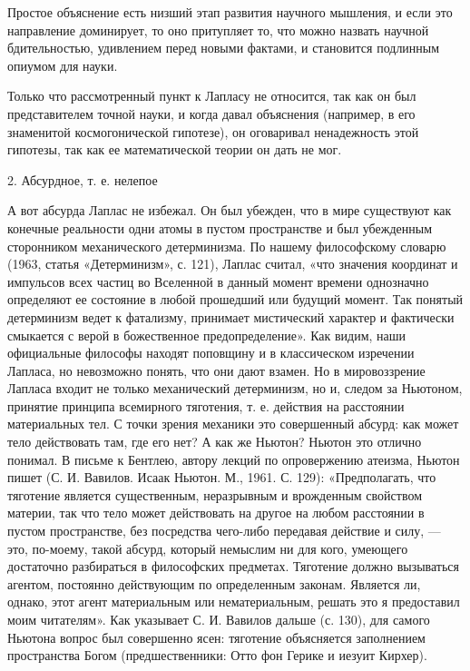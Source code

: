Простое объяснение есть низший этап развития научного мышления, и если
это направление  доминирует, то оно  притупляет то, что  можно назвать
научной бдительностью,  удивлением перед новыми фактами,  и становится
подлинным опиумом для науки.

Только что рассмотренный пункт к Лапласу  не относится, так как он был
представителем точной науки, и когда давал объяснения (например, в его
знаменитой космогонической гипотезе),  он оговаривал ненадежность этой
гипотезы, так как ее математической теории он дать не мог.

2. Абсурдное, т. е. нелепое

А  вот  абсурда  Лаплас  не  избежал.  Он  был  убежден,  что  в  мире
существуют как конечные реальности одни  атомы в пустом пространстве и
был  убежденным  сторонником  механического  детерминизма.  По  нашему
философскому  словарю (1963,  статья  «Детерминизм»,  с. 121),  Лаплас
считал, «что значения координат и импульсов всех частиц во Вселенной в
данный  момент  времени однозначно  определяют  ее  состояние в  любой
прошедший  или  будущий  момент.   Так  понятый  детерминизм  ведет  к
фатализму,  принимает мистический  характер и  фактически смыкается  с
верой  в божественное  предопределение». Как  видим, наши  официальные
философы  находят поповщину  и  в классическом  изречении Лапласа,  но
невозможно понять,  что они  дают взамен.  Но в  мировоззрение Лапласа
входит не только  механический детерминизм, но и,  следом за Ньютоном,
принятие принципа  всемирного тяготения, т. е.  действия на расстоянии
материальных тел. С точки зрения  механики это совершенный абсурд: как
может тело действовать  там, где его нет? А как  же Ньютон? Ньютон это
отлично понимал.  В письме  к Бентлею,  автору лекций  по опровержению
атеизма, Ньютон пишет (С. И. Вавилов. Исаак Ньютон. М., 1961. С. 129):
«Предполагать,  что  тяготение  является существенным,  неразрывным  и
врожденным  свойством  материи,  так  что тело  может  действовать  на
другое  на  любом расстоянии  в  пустом  пространстве, без  посредства
чего-либо передавая действие и силу,  --- это, по-моему, такой абсурд,
который  немыслим  ни  для  кого, умеющего  достаточно  разбираться  в
философских предметах. Тяготение  должно вызываться агентом, постоянно
действующим по  определенным законам. Является ли,  однако, этот агент
материальным  или  нематериальным,  решать   это  я  предоставил  моим
читателям». Как  указывает С. И.  Вавилов дальше (с. 130),  для самого
Ньютона вопрос был совершенно  ясен: тяготение объясняется заполнением
пространства Богом (предшественники: Отто фон Герике и иезуит Кирхер).
